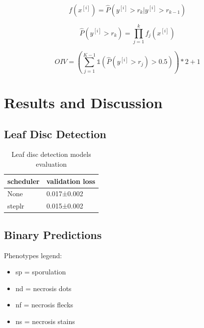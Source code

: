 \documentclass[english]{article}
\begin{document}
\begin{equation}
    f(x^{[i]}) = \hat{P}(y^{[i]} > r_{k}|y^{[i]} > r_{k-1})\label{fml:binclass}
\end{equation}

\begin{equation}
    \hat{P}(y^{[i]} > r_{k}) = \prod_{j=1}^{k}f_{j}(x^{[i]})\label{fml:unconditionalprob}
\end{equation}

\begin{equation}
    OIV = (\sum_{j=1}^{K-1}\mathbb{1}(\hat{P}(y^{[i]} > r_{j}) > 0.5))*2 + 1\label{fml:rankprob}
\end{equation}

\section{Results and Discussion}

\subsection{Leaf Disc Detection}
\begin{table}
    \centering
    \caption{Leaf disc detection models evaluation}
    \label{tab:leafdiscdetectionresult}
    \begin{tabular}{ll}
        \toprule
        scheduler & validation loss \\
        \midrule
        None &  0.017±0.002 \\
        steplr &  0.015±0.002 \\
        \bottomrule
    \end{tabular}
\end{table}




\subsection{Binary Predictions}

Phenotypes legend:
\begin{itemize}
    \item sp = sporulation
    \item nd = necrosis dots
    \item nf = necrosis flecks
    \item ns = necrosis stains
\end{itemize}
\end{document}
